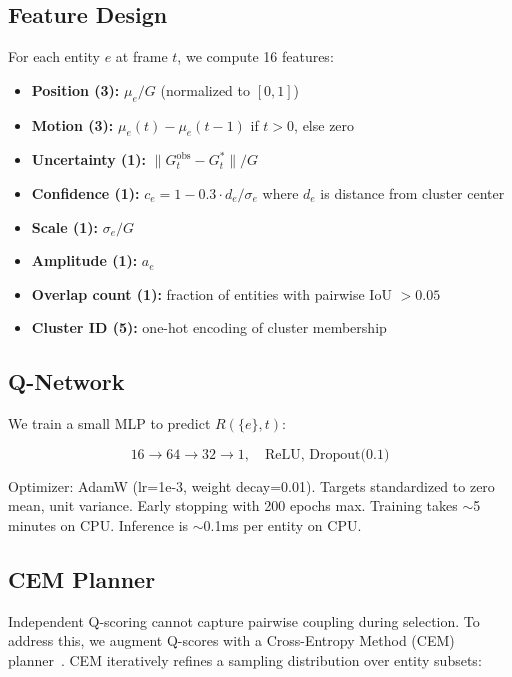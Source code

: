 \documentclass[10pt,twocolumn]{article}
\begin{document}
\subsection{Feature Design}

For each entity $e$ at frame $t$, we compute 16 features:
\begin{itemize}
    \item \textbf{Position (3):} $\mu_e / G$ (normalized to $[0,1]$)
    \item \textbf{Motion (3):} $\mu_e(t) - \mu_e(t-1)$ if $t>0$, else zero
    \item \textbf{Uncertainty (1):} $\|G_t^{\text{obs}} - G_t^*\| / G$
    \item \textbf{Confidence (1):} $c_e = 1 - 0.3 \cdot d_e / \sigma_e$ where $d_e$ is distance from cluster center
    \item \textbf{Scale (1):} $\sigma_e / G$
    \item \textbf{Amplitude (1):} $a_e$
    \item \textbf{Overlap count (1):} fraction of entities with pairwise IoU $> 0.05$
    \item \textbf{Cluster ID (5):} one-hot encoding of cluster membership
\end{itemize}

\subsection{Q-Network}

We train a small MLP to predict $R(\{e\}, t)$:

\[
16 \to 64 \to 32 \to 1,
\quad \text{ReLU, Dropout(0.1)}
\]

Optimizer: AdamW (lr=1e-3, weight decay=0.01). Targets standardized to zero mean, unit variance. Early stopping with 200 epochs max. Training takes $\sim$5 minutes on CPU. Inference is $\sim$0.1ms per entity on CPU.

\subsection{CEM Planner}
\label{sec:cem}

Independent Q-scoring cannot capture pairwise coupling during selection. To address this, we augment Q-scores with a Cross-Entropy Method (CEM) planner~\cite{rubinstein1999cross}. CEM iteratively refines a sampling distribution over entity subsets:
\end{document}
